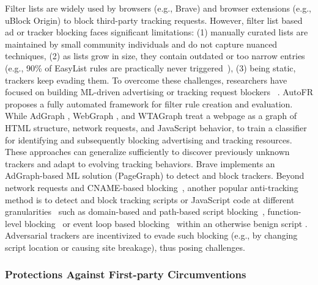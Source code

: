 Filter lists are widely used by browsers (e.g., Brave) and browser extensions (e.g., uBlock Origin) to block third-party tracking requests.
%
However, filter list based ad or tracker blocking faces significant limitations: 
%
(1) manually curated lists are maintained by small community individuals and do not capture nuanced techniques, 
%
(2) as lists grow in size, they contain outdated or too narrow entries (e.g., 90\% of EasyList rules are practically never triggered~\cite{snyderWhoFiltersFilters2020}),
%
(3) being static, trackers keep evading them.
%
To overcome these challenges, researchers have focused on building ML-driven advertising or tracking request blockers ~\cite{iqbalAdGraphGraphBasedApproach2020, sibyWebGraphCapturingAdvertising2022, yangWTAGRAPHWebTracking2022, leAutoFRAutomatedFilter2023}.
%
AutoFR \cite{leAutoFRAutomatedFilter2023} proposes a fully automated framework for filter rule creation and evaluation.
%
While AdGraph \cite{iqbalAdGraphGraphBasedApproach2020}, WebGraph \cite{sibyWebGraphCapturingAdvertising2022}, and WTAGraph \cite{yangWTAGRAPHWebTracking2022} treat a webpage as a graph of HTML structure, network requests, and JavaScript behavior, to train a classifier for identifying and subsequently blocking advertising and tracking resources.
%
These approaches can generalize sufficiently to discover previously unknown trackers and adapt to evolving tracking behaviors. 
%
Brave implements an AdGraph-based ML solution (PageGraph) to detect and block trackers.
%
Beyond network requests and CNAME-based blocking~\cite{daoCNAMECloakingBasedTracking2021}, another popular anti-tracking method is to detect and block tracking scripts or JavaScript code at different granularities~\cite{ikramSeamlessTrackingFreeWeb2017,smithSugarCoatProgrammaticallyGenerating2021} such as domain-based and path-based script blocking~\cite{leCVInspectorAutomatingDetection2021,alrizahErrorsMisunderstandingsAttacks2019,snyderWhoFiltersFilters2020}, function-level blocking~\cite{amjadBlockingJavaScriptBreaking2023,amjadBlockingTrackingJavaScript2024} or event loop based blocking~\cite{chenDetectingFilterList2021} within an otherwise benign script \cite{amjadTrackerSiftUntanglingMixed2021}. %
Adversarial trackers are incentivized to evade such blocking (e.g., by changing script location or causing site breakage), thus posing challenges.



\subsubsection{Protections Against First-party Circumventions}

